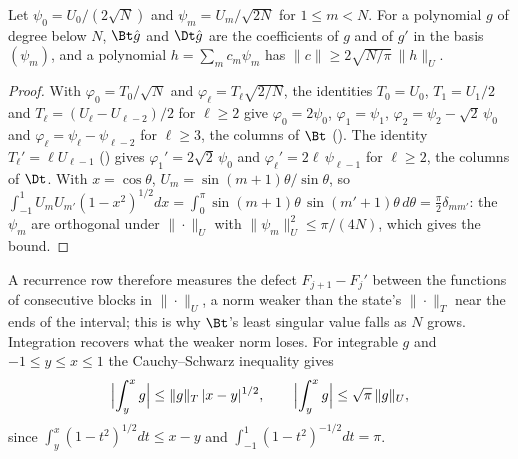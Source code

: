 \begin{lemma}
\label{lem:second-kind}
Let $\psi_0=U_0/(2\sqrt N)$ and $\psi_m=U_m/\sqrt{2N}$ for $1\le m<N$. For a polynomial $g$ of degree below $N$, $\Bt\hat g$ and $\Dt\hat g$ are the coefficients of $g$ and of $g'$ in the basis $(\psi_m)$, and a polynomial $h=\sum_mc_m\psi_m$ has $\|c\|\ge2\sqrt{N/\pi}\,\|h\|_U$.
\end{lemma}
\begin{proof}
With $\varphi_0=T_0/\sqrt N$ and $\varphi_\ell=T_\ell\sqrt{2/N}$, the identities $T_0=U_0$, $T_1=U_1/2$ and $T_\ell=(U_\ell-U_{\ell-2})/2$ for $\ell\ge2$ give $\varphi_0=2\psi_0$, $\varphi_1=\psi_1$, $\varphi_2=\psi_2-\sqrt2\,\psi_0$ and $\varphi_\ell=\psi_\ell-\psi_{\ell-2}$ for $\ell\ge3$, the columns of $\Bt$ (). The identity $T_\ell'=\ell U_{\ell-1}$ () gives $\varphi_1'=2\sqrt2\,\psi_0$ and $\varphi_\ell'=2\ell\,\psi_{\ell-1}$ for $\ell\ge2$, the columns of $\Dt$. With $x=\cos\theta$, $U_m=\sin(m+1)\theta/\sin\theta$, so $\int_{-1}^1U_mU_{m'}(1-x^2)^{1/2}dx=\int_0^\pi\sin(m+1)\theta\,\sin(m'+1)\theta\,d\theta=\tfrac\pi2\delta_{mm'}$: the $\psi_m$ are orthogonal under $\|\cdot\|_U$ with $\|\psi_m\|_U^2\le\pi/(4N)$, which gives the bound.
\end{proof}

A recurrence row therefore measures the defect $F_{j+1}-F_j'$ between the functions of consecutive blocks in $\|\cdot\|_U$, a norm weaker than the state's $\|\cdot\|_T$ near the ends of the interval; this is why $\Bt$'s least singular value falls as $N$ grows. Integration recovers what the weaker norm loses. For integrable $g$ and $-1\le y\le x\le1$ the Cauchy--Schwarz inequality gives
\begin{equation}
    \Bigl|\int_y^xg\Bigr|\le\|g\|_T\,|x-y|^{1/2},
    \qquad
    \Bigl|\int_y^xg\Bigr|\le\sqrt\pi\,\|g\|_U ,
    \label{eq:app-integral-bounds}
\end{equation}
since $\int_y^x(1-t^2)^{1/2}dt\le x-y$ and $\int_{-1}^1(1-t^2)^{-1/2}dt=\pi$.

